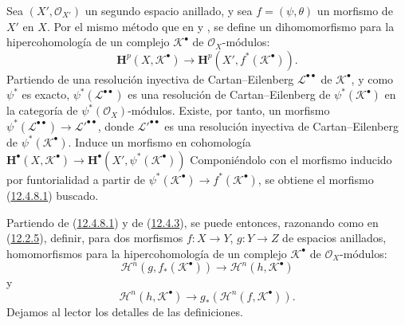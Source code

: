 \begin{env}[12.4.8]
\label{0.12.4.8}
\label{0.12.4.8-fr}
Sea $(X',\mathcal O_{X'})$ un segundo espacio anillado, y sea
$f=(\psi,\theta)$ un morfismo de $X'$ en $X$.
Por el mismo método que en  y , se
define un dihomomorfismo para la hipercohomología de un complejo
$\mathcal K^\bullet$ de $\mathcal O_X$-módulos:
\begin{equation}
\label{0.12.4.8.1-fr}
\tag{12.4.8.1}
\mathbf H^p(X,\mathcal K^\bullet)
\longrightarrow\mathbf H^p(X',f^*(\mathcal K^\bullet)).
\end{equation}
Partiendo de una resolución inyectiva de Cartan--Eilenberg
$\mathcal L^{\bullet\bullet}$ de $\mathcal K^\bullet$, y como $\psi^*$ es exacto, $\psi^*(\mathcal L^{\bullet\bullet})$ es una
resolución de Cartan--Eilenberg de $\psi^*(\mathcal K^\bullet)$ en la
categoría de $\psi^*(\mathcal O_X)$-módulos.
Existe, por tanto, un morfismo
$\psi^*(\mathcal L^{\bullet\bullet})\to
\mathcal L'^{\bullet\bullet}$,
donde $\mathcal L'^{\bullet\bullet}$ es una resolución inyectiva de
Cartan--Eilenberg de $\psi^*(\mathcal K^\bullet)$.
Induce un morfismo en cohomología
$\mathbf H^\bullet(X,\mathcal K^\bullet)\longrightarrow\mathbf H^\bullet(X',\psi^*(\mathcal K^\bullet))$
Componiéndolo con el morfismo inducido por funtorialidad a partir de
$\psi^*(\mathcal K^\bullet)\to f^*(\mathcal K^\bullet)$, se obtiene el morfismo (\hyperref[0.12.4.8.1-fr]{12.4.8.1}) buscado.

Partiendo de (\hyperref[0.12.4.8.1-fr]{12.4.8.1}) y de (\hyperref[0.12.4.3-fr]{12.4.3}), se puede entonces, razonando como en (\hyperref[0.12.2.5-fr]{12.2.5}), definir, para dos morfismos $f:X\to Y$, $g:Y\to Z$ de espacios anillados, homomorfismos para la hipercohomología de un complejo $\mathcal K^\bullet$ de $\mathcal O_X$-módulos:
\begin{equation}
\label{0.12.4.8.2-fr}
\tag{12.4.8.2}
\mathscr H^n(g,f_*(\mathcal K^\bullet))
\longrightarrow\mathscr H^n(h,\mathcal K^\bullet)
\end{equation}
y
\begin{equation}
\label{0.12.4.8.3-fr}
\tag{12.4.8.3}
\mathscr H^n(h,\mathcal K^\bullet)
\longrightarrow g_*(\mathscr H^n(f,\mathcal K^\bullet)).
\end{equation}
Dejamos al lector los detalles de las definiciones.
\end{env}
